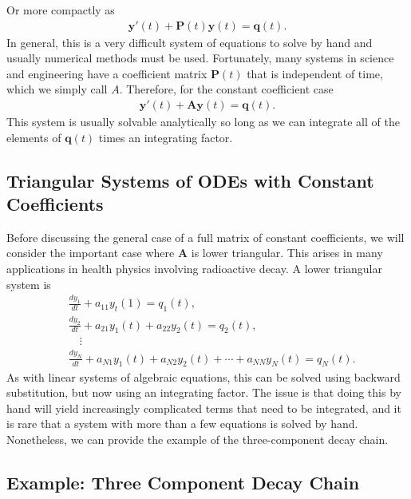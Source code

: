 Or more compactly as
\begin{align}
  \mathbf{y}'(t) + \mathbf{P}(t) \mathbf{y}(t) = \mathbf{q}(t).
\end{align}
In general, this is a very difficult system of equations to solve by hand and usually numerical methods must be used. Fortunately, many systems in science and engineering have a coefficient matrix $\mathbf{P}(t)$ that is independent of time, which we simply call $A$. Therefore, for the constant coefficient case
\begin{align}
  \mathbf{y}'(t) + \mathbf{A} \mathbf{y}(t) = \mathbf{q}(t).
\end{align}
This system is usually solvable analytically so long as we can integrate all of the elements of $\mathbf{q}(t)$ times an integrating factor.

\subsection{Triangular Systems of ODEs with Constant Coefficients}

Before discussing the general case of a full matrix of constant coefficients, we will consider the important case where $\mathbf{A}$ is lower triangular. This arises in many applications in health physics involving radioactive decay. A lower triangular system is
\begin{align}
  &\frac{dy_1}{dt} + a_{11} y_t(1) = q_1(t), \nonumber \\
  &\frac{dy_2}{dt} + a_{21} y_1(t) + a_{22} y_2(t) = q_2(t), \nonumber \\
  &\quad \vdots \nonumber \\
  &\frac{dy_N}{dt} + a_{N1} y_1(t) + a_{N2} y_2(t) + \cdots + a_{NN} y_N(t) = q_N(t).
\end{align}
As with linear systems of algebraic equations, this can be solved using backward substitution, but now using an integrating factor. The issue is that doing this by hand will yield increasingly complicated terms that need to be integrated, and it is rare that a system with more than a few equations is solved by hand. Nonetheless, we can provide the example of the three-component decay chain.

\subsection{Example: Three Component Decay Chain}

